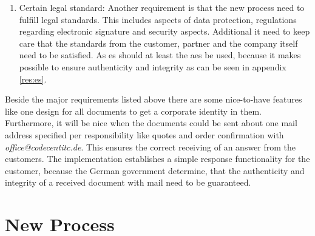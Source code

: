 \begin{enumerate}
	\item Certain legal standard: \newline
	Another requirement is that the new process need to fulfill legal standards. This includes aspects of data protection, regulations regarding electronic signature and security aspects. Additional it need to keep care that the standards from the customer, partner and the company itself need to be satisfied. \newline
	As \gls{es} should at least the \gls{aes} be used, because it makes possible to ensure authenticity and integrity as can be seen in appendix \ref{res:es}. 
\end{enumerate}
Beside the major requirements listed above there are some nice-to-have features like one design for all documents to get a corporate identity in them. Furthermore, it will be nice when the documents could be sent about one mail address specified per responsibility like quotes and order confirmation with \textit{office@codecentitc.de}. This ensures the correct receiving of an answer from the customers. The implementation establishes a simple response functionality for the customer, because the German government determine, that the authenticity and integrity of a received document with mail need to be guaranteed. 

\section{New Process}
